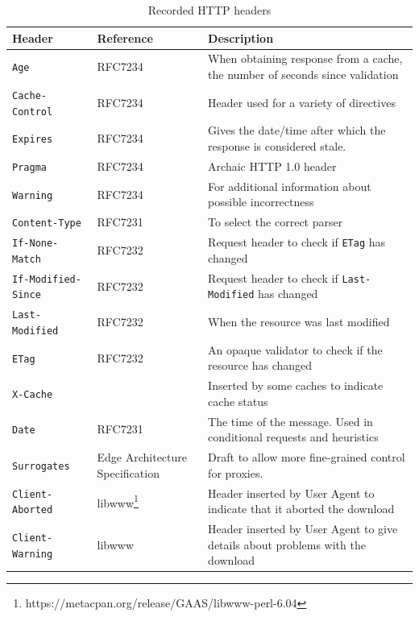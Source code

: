 \documentclass{llncs}
\newcommand{\httph}[1]{\texttt{#1}}
\begin{document}
\begin{subappendices}
\begin{table}
\caption{Recorded HTTP headers}\label{tab:headers}
 \begin{tabular}{ | l |  p{3cm} | p{5cm} |}
    \hline
    Header & Reference & Description \\ \hline
\httph{Age} & RFC7234 & When obtaining response from a cache, the number of
seconds since validation \\ \hline
\httph{Cache-Control} & RFC7234 & Header used for a variety of directives \\ \hline
\httph{Expires} & RFC7234  & Gives the date/time after which the
   response is considered stale. \\ \hline
\httph{Pragma} & RFC7234 & Archaic HTTP 1.0 header  \\ \hline
\httph{Warning} & RFC7234  & For additional information about possible incorrectness \\ \hline
\httph{Content-Type} & RFC7231 & To select the correct parser \\ \hline
\httph{If-None-Match} & RFC7232  & Request header to check if
                                   \httph{ETag} has changed   \\ \hline
\httph{If-Modified-Since} & RFC7232  & Request header to check if
                                   \httph{Last-Modified} has changed    \\ \hline
\httph{Last-Modified} & RFC7232 & When the resource was last modified \\ \hline
\httph{ETag} & RFC7232 & An opaque validator to check if the resource
has changed  \\ \hline
\httph{X-Cache} &  & Inserted by some caches to indicate cache status \\ \hline
\httph{Date} & RFC7231 & The time of the message. Used in conditional requests
and heuristics \\ \hline
\httph{Surrogates} & Edge Architecture Specification\cite{edgearch} & Draft
to allow more fine-grained control for proxies. \\ \hline
\httph{Client-Aborted} & libwww\footnote{https://metacpan.org/release/GAAS/libwww-perl-6.04}  & Header inserted by User
Agent to indicate that it aborted the download \\ \hline
\httph{Client-Warning} & libwww  & Header inserted by User
Agent to give details about problems with the download \\ \hline

    \hline
    \end{tabular}
\end{table}



\end{subappendices}
\end{document}
